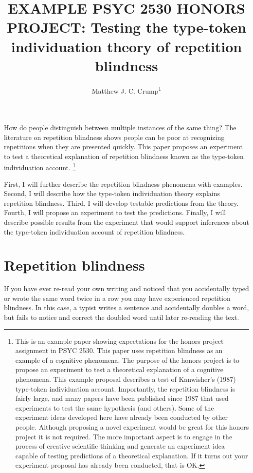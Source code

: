 \documentclass[
  man,floatsintext]{apa6}
\title{EXAMPLE PSYC 2530 HONORS PROJECT: Testing the type-token individuation theory of repetition blindness}
\author{Matthew J. C. Crump\textsuperscript{1}}
\date{}
\affiliation{\vspace{0.5cm}\textsuperscript{1} Brooklyn College of the City University of New York}
\begin{document}
\maketitle

How do people distinguish between multiple instances of the same thing? The literature on repetition blindness shows people can be poor at recognizing repetitions when they are presented quickly. This paper proposes an experiment to test a theoretical explanation of repetition blindness known as the type-token individuation account. \footnote{This is an example paper showing expectations for the honors project assignment in PSYC 2530. This paper uses repetition blindness as an example of a cognitive phenomena. The purpose of the honors project is to propose an experiment to test a theoretical explanation of a cognitive phenomena. This example proposal describes a test of Kanwisher's (1987) type-token individuation account. Importantly, the repetition blindness is fairly large, and many papers have been published since 1987 that used experiments to test the same hypothesis (and others). Some of the experiment ideas developed here have already been conducted by other people. Although proposing a novel experiment would be great for this honors project it is not required. The more important aspect is to engage in the process of creative scientific thinking and generate an experiment idea capable of testing predictions of a theoretical explanation. If it turns out your experiment proposal has already been conducted, that is OK.}

First, I will further describe the repetition blindness phenomena with examples. Second, I will describe how the type-token individuation theory explains repetition blindness. Third, I will develop testable predictions from the theory. Fourth, I will propose an experiment to test the predictions. Finally, I will describe possible results from the experiment that would support inferences about the type-token individuation account of repetition blindness.

\hypertarget{repetition-blindness}{%
\section{Repetition blindness}\label{repetition-blindness}}

If you have ever re-read your own writing and noticed that you accidentally typed or wrote the same word twice in a row you may have experienced repetition blindness. In this case, a typist writes a sentence and accidentally doubles a word, but fails to notice and correct the doubled word until later re-reading the text.
\end{document}
